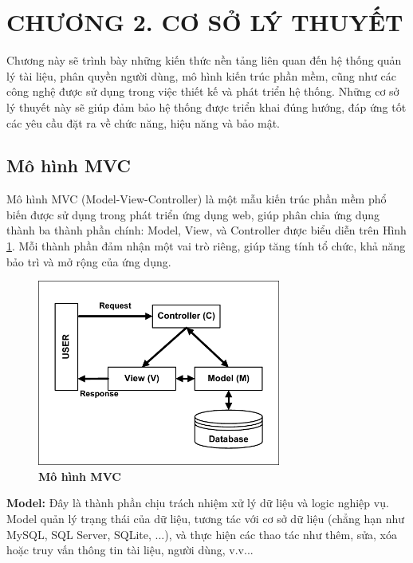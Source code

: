 \documentclass{article}
\begin{document}
	\section*{CHƯƠNG 2. CƠ SỞ LÝ THUYẾT}
	\setcounter{section}{2}
	\setcounter{subsection}{0}
	\setcounter{figure}{0}
	\setcounter{table}{0}
	
	Chương này sẽ trình bày những kiến thức nền tảng liên quan đến hệ thống quản lý tài liệu, phân quyền người dùng, mô hình kiến trúc phần mềm, cũng như các công nghệ được sử dụng trong việc thiết kế và phát triển hệ thống. Những cơ sở lý thuyết này sẽ giúp đảm bảo hệ thống được triển khai đúng hướng, đáp ứng tốt các yêu cầu đặt ra về chức năng, hiệu năng và bảo mật.
	
	\subsection{Mô hình MVC}
	
	Mô hình MVC (Model-View-Controller) là một mẫu kiến trúc phần mềm phổ biến được sử dụng trong phát triển ứng dụng web, giúp phân chia ứng dụng thành ba thành phần chính: Model, View, và Controller được biểu diễn trên Hình \ref{fig21}. Mỗi thành phần đảm nhận một vai trò riêng, giúp tăng tính tổ chức, khả năng bảo trì và mở rộng của ứng dụng. 
	
	\begin{figure}[!ht]
		\centering
		\includegraphics[trim= 10pt 10pt 10pt 10pt, clip, width=8cm]{mvc_fig21.pdf}
		\caption[Mô hình MVC]{\bfseries \fontsize{12pt}{0pt}\selectfont Mô hình MVC}
		\label{fig21}
	\end{figure}
	
	\textbf{Model:} Đây là thành phần chịu trách nhiệm xử lý dữ liệu và logic nghiệp vụ. Model quản lý trạng thái của dữ liệu, tương tác với cơ sở dữ liệu (chẳng hạn như MySQL, SQL Server, SQLite, ...), và thực hiện các thao tác như thêm, sửa, xóa hoặc truy vấn thông tin tài liệu, người dùng, v.v...
	
\end{document}
